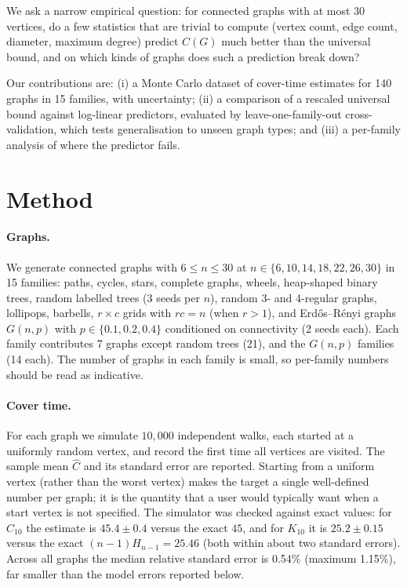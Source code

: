 \documentclass{article}
\begin{document}
We ask a narrow empirical question: for connected graphs with at most 30 vertices, do a few statistics that are trivial to compute (vertex count, edge count, diameter, maximum degree) predict $C(G)$ much better than the universal bound, and on which kinds of graphs does such a prediction break down?

Our contributions are: (i) a Monte Carlo dataset of cover-time estimates for 140 graphs in 15 families, with uncertainty; (ii) a comparison of a rescaled universal bound against log-linear predictors, evaluated by leave-one-family-out cross-validation, which tests generalisation to unseen graph types; and (iii) a per-family analysis of where the predictor fails.

\section{Method}
\paragraph{Graphs.} We generate connected graphs with $6\le n\le 30$ at $n\in\{6,10,14,18,22,26,30\}$ in 15 families: paths, cycles, stars, complete graphs, wheels, heap-shaped binary trees, random labelled trees (3 seeds per $n$), random 3- and 4-regular graphs, lollipops, barbells, $r\times c$ grids with $rc=n$ (when $r>1$), and Erd\H{o}s--R\'enyi graphs $G(n,p)$ with $p\in\{0.1,0.2,0.4\}$ conditioned on connectivity (2 seeds each). Each family contributes 7 graphs except random trees (21), and the $G(n,p)$ families (14 each). The number of graphs in each family is small, so per-family numbers should be read as indicative.

\paragraph{Cover time.} For each graph we simulate $10{,}000$ independent walks, each started at a uniformly random vertex, and record the first time all vertices are visited. The sample mean $\hat C$ and its standard error are reported. Starting from a uniform vertex (rather than the worst vertex) makes the target a single well-defined number per graph; it is the quantity that a user would typically want when a start vertex is not specified. The simulator was checked against exact values: for $C_{10}$ the estimate is $45.4\pm0.4$ versus the exact $45$, and for $K_{10}$ it is $25.2\pm0.15$ versus the exact $(n-1)H_{n-1}=25.46$ (both within about two standard errors). Across all graphs the median relative standard error is 0.54\% (maximum 1.15\%), far smaller than the model errors reported below.
\end{document}
